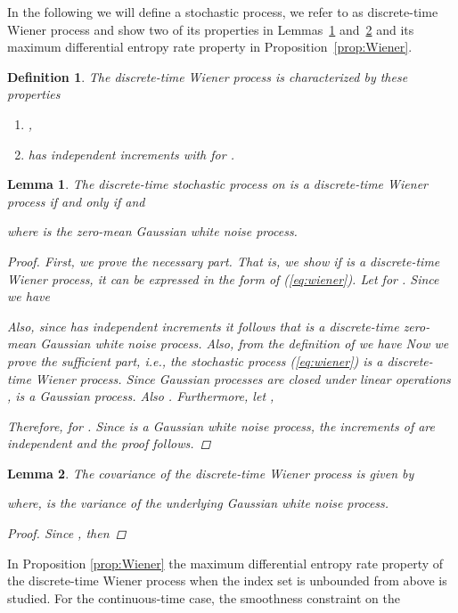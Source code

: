 \documentclass{article}
\newtheorem{mydef}{Definition}
\newtheorem{lem}{Lemma}
\begin{document}
In the following we will define a stochastic process, we refer to as
discrete-time Wiener process and show two of its properties in
Lemmas~\ref{lem:Wiener} and~\ref{lem:covWiener} and its maximum
differential entropy rate property in
Proposition~\ref{prop:Wiener}.
\begin{mydef}
The discrete-time Wiener process  is characterized by these properties
\begin{enumerate}
\item ,
\item  has independent increments with   for .\hfill \end{enumerate}
\end{mydef}
\begin{lem}
\label{lem:Wiener} The discrete-time stochastic process   on
 is  a discrete-time Wiener process if and only if
 and

where  is the zero-mean Gaussian white noise process.\begin{proof}
First, we prove the necessary part. That is, we show if  is a
discrete-time Wiener process, it can be expressed in the form of
(\ref{eq:wiener}). Let  for
. Since  we have

Also, since  has independent increments it follows that  is a
discrete-time zero-mean Gaussian white noise process. Also, from the
definition of  we have 
\small{}\normalsize
Now we prove the sufficient part, i.e., the stochastic process
(\ref{eq:wiener}) is a discrete-time Wiener process. Since Gaussian
processes are closed under linear operations \cite{RasmussenW:06},
 is a Gaussian process. Also .
Furthermore, let ,

Therefore,   for . Since  is a Gaussian white
noise process, the increments of  are independent and the proof
follows.
\end{proof}

\end{lem}
\begin{lem}
\label{lem:covWiener}
The covariance of the discrete-time Wiener process is given by

where,  is the variance of the underlying Gaussian white noise process.
\begin{proof} Since , then 

\end{proof}
\end{lem}
In Proposition \ref{prop:Wiener} the maximum differential entropy
rate property of the discrete-time Wiener process when the index set is unbounded from above is studied. For
the continuous-time case, the smoothness constraint on the
\end{document}

